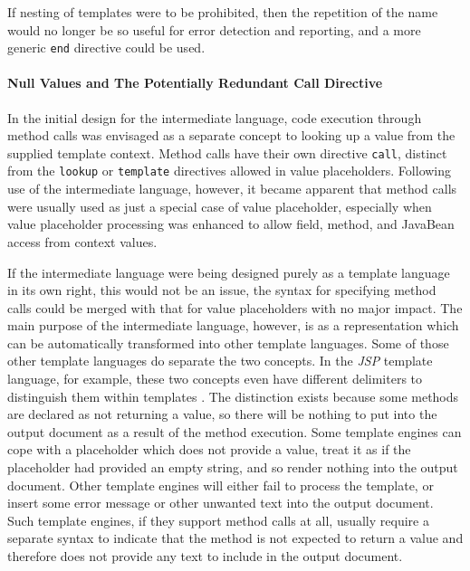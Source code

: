 If nesting of templates were to be prohibited, then the repetition of the name would no longer be so useful for error detection and reporting, and a more generic \verb!end! directive could be used.

\paragraph{Null Values and The Potentially Redundant Call Directive}

In the initial design for the intermediate language, code execution through method calls was envisaged as a separate concept to looking up a value from the supplied template context. Method calls have their own directive \verb!call!, distinct from the \verb!lookup! or \verb!template! directives allowed in value placeholders. Following use of the intermediate language, however, it became apparent that method calls were usually used as just a special case of value placeholder, especially when value placeholder processing was enhanced to allow field, method, and JavaBean access from context values.

If the intermediate language were being designed purely as a template language in its own right, this would not be an issue, the syntax for specifying method calls could be merged with that for value placeholders with no major impact. The main purpose of the intermediate language, however, is as a representation which can be automatically transformed into other template languages. Some of those other template languages do separate the two concepts. In the \emph{JSP} template language, for example, these two concepts even have different delimiters to distinguish them within templates \citep{Oracle2000}. The distinction exists because some methods are declared as not returning a value, so there will be nothing to put into the output document as a result of the method execution. Some template engines can cope with a placeholder which does not provide a value, treat it as if the placeholder had provided an empty string, and so render nothing into the output document. Other template engines will either fail to process the template, or insert some error message or other unwanted text into the output document. Such template engines, if they support method calls at all, usually require a separate syntax to indicate that the method is not expected to return a value and therefore does not provide any text to include in the output document.


